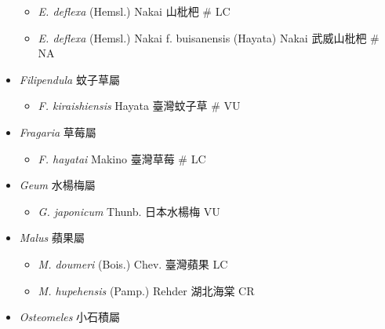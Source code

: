 \begin{itemize}
  \begin{itemize}
        \item[] \textit{E. deflexa} (Hemsl.) Nakai  山枇杷  \# LC
        \item[] \textit{E. deflexa} (Hemsl.) Nakai f. buisanensis (Hayata) Nakai  武威山枇杷  \# NA
  \end{itemize}
 \item[] \textit{Filipendula} 蚊子草屬
                                
  \begin{itemize}
        \item[] \textit{F. kiraishiensis} Hayata  臺灣蚊子草  \# VU
  \end{itemize}
 \item[] \textit{Fragaria} 草莓屬
                                
  \begin{itemize}
        \item[] \textit{F. hayatai} Makino  臺灣草莓  \# LC
  \end{itemize}
 \item[] \textit{Geum} 水楊梅屬
                                
  \begin{itemize}
        \item[] \textit{G. japonicum} Thunb.  日本水楊梅   VU
  \end{itemize}
 \item[] \textit{Malus} 蘋果屬
                                
  \begin{itemize}
        \item[] \textit{M. doumeri} (Bois.) Chev.  臺灣蘋果   LC
        \item[] \textit{M. hupehensis} (Pamp.) Rehder  湖北海棠   CR
  \end{itemize}
 \item[] \textit{Osteomeles} 小石積屬
                                

\end{itemize}
